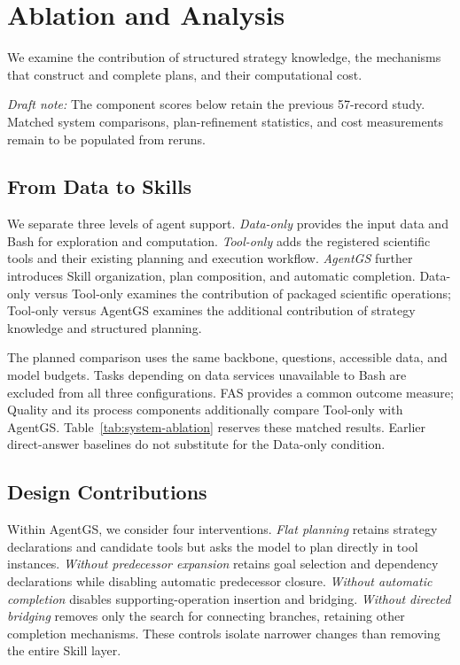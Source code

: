 \section{Ablation and Analysis}
\label{sec:ablations}
We examine the contribution of structured strategy knowledge, the mechanisms that construct and complete plans, and their computational cost.

\emph{Draft note:} The component scores below retain the previous 57-record study. Matched system comparisons, plan-refinement statistics, and cost measurements remain to be populated from reruns.

\subsection{From Data to Skills}
\label{sec:knowledge-ablation}
We separate three levels of agent support. \emph{Data-only} provides the input data and Bash for exploration and computation. \emph{Tool-only} adds the registered scientific tools and their existing planning and execution workflow. \emph{AgentGS} further introduces Skill organization, plan composition, and automatic completion. Data-only versus Tool-only examines the contribution of packaged scientific operations; Tool-only versus AgentGS examines the additional contribution of strategy knowledge and structured planning.

The planned comparison uses the same backbone, questions, accessible data, and model budgets. Tasks depending on data services unavailable to Bash are excluded from all three configurations. FAS provides a common outcome measure; Quality and its process components additionally compare Tool-only with AgentGS. Table~\ref{tab:system-ablation} reserves these matched results. Earlier direct-answer baselines do not substitute for the Data-only condition.


\subsection{Design Contributions}
\label{sec:design-contributions}
Within AgentGS, we consider four interventions. \emph{Flat planning} retains strategy declarations and candidate tools but asks the model to plan directly in tool instances. \emph{Without predecessor expansion} retains goal selection and dependency declarations while disabling automatic predecessor closure. \emph{Without automatic completion} disables supporting-operation insertion and bridging. \emph{Without directed bridging} removes only the search for connecting branches, retaining other completion mechanisms. These controls isolate narrower changes than removing the entire Skill layer.

